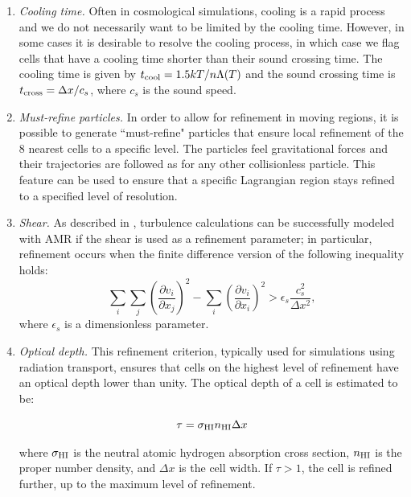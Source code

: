 \begin{enumerate}
\item{\em Cooling time.}  Often in cosmological simulations, cooling is a rapid process and we do not necessarily want to be limited by the cooling time.  However, in some cases it is desirable to resolve the cooling process, in which case we flag cells that have a cooling time shorter than their sound crossing time.  The cooling time is given by $t_{\rm cool} = 1.5 kT / n \Lambda(T)$ and the sound crossing time is $t_{\rm cross} = \Delta x / c_s$, where $c_s$ is the sound speed.

\item{\em Must-refine particles.}  In order to allow for refinement in moving regions, it is possible to generate ``must-refine" particles that ensure local refinement of the 8 nearest cells to a specific level.  The particles feel gravitational forces and their trajectories are followed as for any other collisionless particle.  This feature can be used to ensure that a specific Lagrangian region stays refined to a specified level of resolution. 

\item{\em Shear.} As described in \citet{Kritsuk06}, turbulence calculations can be successfully modeled with AMR if the shear is used as a refinement parameter; in particular, refinement occurs when the finite difference version of the following inequality holds:
\begin{equation}
\sum_i \sum_j \left( \frac{\partial v_i}{\partial x_j} \right)^2 -  \sum_i \left( \frac{\partial v_i}{\partial x_i} \right)^2
> \epsilon_s \frac{c_s^2}{\Delta x^2},
\end{equation}
where $\epsilon_s$ is a dimensionless parameter.

\item{\em Optical depth.} This refinement criterion, typically used for simulations using radiation transport, ensures that cells on the highest level of refinement have an  optical depth lower than unity.  The optical depth of a cell is estimated to be:

\begin{equation}
\tau = \sigma_{\rm HI} n_{\rm HI} \Delta x 
\end{equation}

where $\sigma_{\rm HI}$ is the neutral atomic hydrogen absorption
cross section, $n_{\rm HI}$ is the proper  number density,
and $\Delta x$ is the cell width.  If $\tau > 1$, the cell is refined
further, up to the maximum level of refinement.


\end{enumerate}

